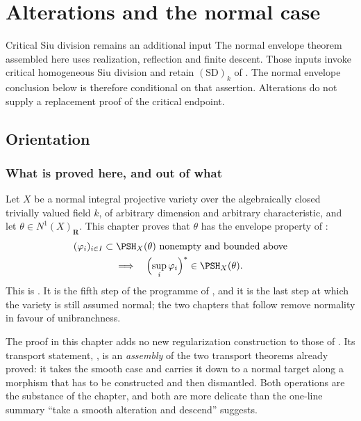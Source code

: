\chapter{Alterations and the normal case}
\label{chap:bj-alterations}

\begin{warning}{Critical Siu division remains an additional input}
\label{warn:ch42-siu-dependency}
The normal envelope theorem assembled here uses realization, reflection
and finite descent. Those inputs invoke critical homogeneous Siu division
and retain $\mathrm{(SD)}_k$ of . The normal
envelope conclusion below is therefore conditional on that assertion.
Alterations do not supply a replacement proof of the critical endpoint.
\end{warning}

\section{Orientation}
\label{sec:ch42-orientation}

\subsection{What is proved here, and out of what}
\label{sec:ch42-what}

Let $X$ be a normal integral projective variety over the algebraically
closed trivially valued field $k$, of arbitrary dimension and arbitrary
characteristic, and let $\theta\in N^1(X)_{\mathbf R}$.  This chapter
proves that $\theta$ has the envelope property of
:
\[
 \begin{gathered}
 (\varphi_i)_{i\in I}\subset\PSH_X(\theta)
 \ \text{nonempty and bounded above}\\
 \Longrightarrow\quad
 \Bigl(\sup_i\varphi_i\Bigr)^*\in\PSH_X(\theta).
 \end{gathered}
\]
This is .  It is the fifth step of the
programme of , and it is the last step at which the
variety is still assumed normal; the two chapters that follow remove
normality in favour of unibranchness.

The proof in this chapter adds no new regularization construction
to those of .  Its transport statement,
, is an \emph{assembly} of the two
transport theorems already proved: it takes the smooth case and carries it
down to a normal target along a morphism that has to be constructed and then
dismantled.  Both operations are the substance of the chapter, and both are
more delicate than the one-line summary ``take a smooth alteration and
descend'' suggests.

